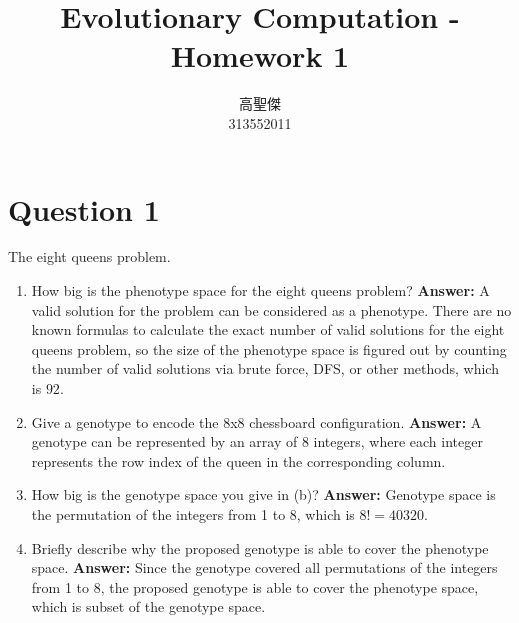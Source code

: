 \documentclass[12pt,letterpaper]{article}
\newcommand{\xAns}{\vskip 2mm\textbf{Answer:} }
\begin{document}
\begin{CJK}{UTF8}{bkai}
    \title{Evolutionary Computation - Homework 1}

    \author{
        高聖傑\\
        313552011\\
    }

    \maketitle
\end{CJK}

\section*{Question 1}
The eight queens problem.
\begin{enumerate}[label=(\alph*)]
    \item How big is the phenotype space for the eight queens problem? \xAns A valid solution for the problem can be considered as a phenotype. There are no known formulas to calculate the exact number of valid solutions for the eight queens problem, so the size of the phenotype space is figured out by counting the number of valid solutions via brute force, DFS, or other methods, which is $92$.
    \item Give a genotype to encode the 8x8 chessboard configuration. \xAns A genotype can be represented by an array of 8 integers, where each integer represents the row index of the queen in the corresponding column.
    \item How big is the genotype space you give in (b)? \xAns Genotype space is the permutation of the integers from 1 to 8, which is $8! = 40320$.
    \item Briefly describe why the proposed genotype is able to cover the phenotype space. \xAns Since the genotype covered all permutations of the integers from 1 to 8, the proposed genotype is able to cover the phenotype space, which is subset of the genotype space.
\end{enumerate}
\end{document}
